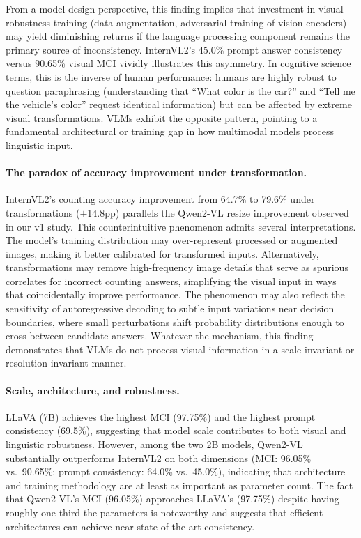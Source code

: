 \documentclass{cvpr}
\begin{document}
From a model design perspective, this finding implies that investment in visual robustness training (data augmentation, adversarial training of vision encoders) may yield diminishing returns if the language processing component remains the primary source of inconsistency. InternVL2's 45.0\% prompt answer consistency versus 90.65\% visual MCI vividly illustrates this asymmetry. In cognitive science terms, this is the inverse of human performance: humans are highly robust to question paraphrasing (understanding that ``What color is the car?'' and ``Tell me the vehicle's color'' request identical information) but can be affected by extreme visual transformations. VLMs exhibit the opposite pattern, pointing to a fundamental architectural or training gap in how multimodal models process linguistic input.

\paragraph{The paradox of accuracy improvement under transformation.}
InternVL2's counting accuracy improvement from 64.7\% to 79.6\% under transformations ($+$14.8pp) parallels the Qwen2-VL resize improvement observed in our v1 study. This counterintuitive phenomenon admits several interpretations. The model's training distribution may over-represent processed or augmented images, making it better calibrated for transformed inputs. Alternatively, transformations may remove high-frequency image details that serve as spurious correlates for incorrect counting answers, simplifying the visual input in ways that coincidentally improve performance. The phenomenon may also reflect the sensitivity of autoregressive decoding to subtle input variations near decision boundaries, where small perturbations shift probability distributions enough to cross between candidate answers. Whatever the mechanism, this finding demonstrates that VLMs do not process visual information in a scale-invariant or resolution-invariant manner.

\paragraph{Scale, architecture, and robustness.}
LLaVA (7B) achieves the highest MCI (97.75\%) and the highest prompt consistency (69.5\%), suggesting that model scale contributes to both visual and linguistic robustness. However, among the two 2B models, Qwen2-VL substantially outperforms InternVL2 on both dimensions (MCI: 96.05\% vs.\ 90.65\%; prompt consistency: 64.0\% vs.\ 45.0\%), indicating that architecture and training methodology are at least as important as parameter count. The fact that Qwen2-VL's MCI (96.05\%) approaches LLaVA's (97.75\%) despite having roughly one-third the parameters is noteworthy and suggests that efficient architectures can achieve near-state-of-the-art consistency.
\end{document}
